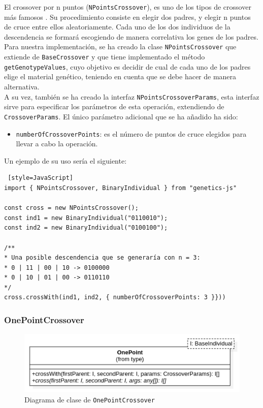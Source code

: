 El crossover por n puntos (\texttt{NPointsCrossover}), es uno de los tipos de crossover más famosos \cite{spears1991analysis}. Su procedimiento consiste en elegir dos padres, y elegir n puntos de cruce entre ellos aleatoriamente. Cada uno de los dos individuos de la descendencia se formará escogiendo de manera correlativa los genes de los padres. \\

Para nuestra implementación, se ha creado la clase \texttt{NPointsCrossover} que extiende de \texttt{BaseCrossover} y que tiene implementado el método \texttt{getGenotypeValues}, cuyo objetivo es decidir de cual de cada uno de los padres elige el material genético, teniendo en cuenta que se debe hacer de manera alternativa. \\

A su vez, también se ha creado la interfaz \texttt{NPointsCrossoverParams}, esta interfaz sirve para especificar los parámetros de esta operación, extendiendo de \texttt{CrossoverParams}. El único parámetro adicional que se ha añadido ha sido:

\begin{itemize}
    \item \texttt{numberOfCrossoverPoints}: es el número de puntos de cruce elegidos para llevar a cabo la operación.
\end{itemize}

Un ejemplo de su uso sería el siguiente: \\

\begin{lstlisting} [style=JavaScript]
import { NPointsCrossover, BinaryIndividual } from "genetics-js"

const cross = new NPointsCrossover();
const ind1 = new BinaryIndividual("0110010");
const ind2 = new BinaryIndividual("0100100");

/**
* Una posible descendencia que se generaría con n = 3:
* 0 | 11 | 00 | 10 -> 0100000
* 0 | 10 | 01 | 00 -> 0110110
*/
cross.crossWith(ind1, ind2, { numberOfCrossoverPoints: 3 }}))
\end{lstlisting}

\subsubsection{OnePointCrossover}

\begin{figure}[ht]
    \centering
    \includegraphics[scale=0.5]{mem/images/cap-4/4.2.6(Crossover)/OnePoint.png}
    \caption{Diagrama de clase de \texttt{OnePointCrossover}}
    \label{fig:my_label}
\end{figure}


